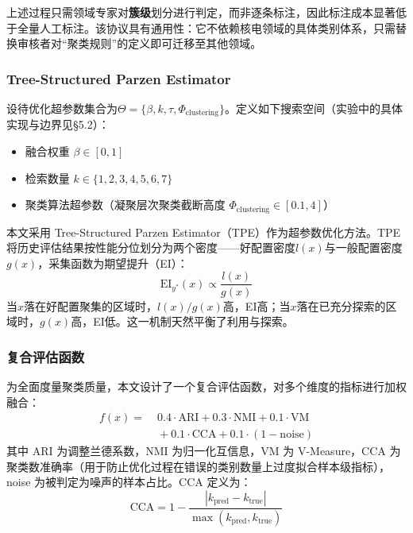 \documentclass[10.5pt,compsoc,UTF8]{CjC}
\theoremstyle{mystyle}
\begin{document}
上述过程只需领域专家对\textbf{簇级}划分进行判定，而非逐条标注，因此标注成本显著低于全量人工标注。该协议具有通用性：它不依赖核电领域的具体类别体系，只需替换审核者对``聚类规则''的定义即可迁移至其他领域。

\subsubsection{Tree-Structured Parzen Estimator}

设待优化超参数集合为$\Theta = \{\beta, k, \tau, \Phi_{\text{clustering}}\}$。定义如下搜索空间（实验中的具体实现与边界见\S 5.2）：
\begin{itemize}[leftmargin=1.5em,itemsep=1pt]
  \item 融合权重 $\beta \in [0, 1]$
  \item 检索数量 $k \in \{1, 2, 3, 4, 5, 6, 7\}$
  \item 聚类算法超参数（凝聚层次聚类截断高度 $\Phi_{\text{clustering}} \in [0.1, 4]$）
\end{itemize}

本文采用 Tree-Structured Parzen Estimator（TPE）作为超参数优化方法。TPE 将历史评估结果按性能分位划分为两个密度——好配置密度$l(x)$与一般配置密度$g(x)$，采集函数为期望提升（EI）：
\begin{equation}
\mathrm{EI}_{y^*}(x) \propto \frac{l(x)}{g(x)}
\label{eq:tpe}
\end{equation}
当$x$落在好配置聚集的区域时，$l(x)/g(x)$高，EI高；当$x$落在已充分探索的区域时，$g(x)$高，EI低。这一机制天然平衡了利用与探索。

\subsubsection{复合评估函数}

为全面度量聚类质量，本文设计了一个复合评估函数，对多个维度的指标进行加权融合：
\begin{equation}
\begin{aligned}
f(x) = &\; 0.4 \cdot \mathrm{ARI} + 0.3 \cdot \mathrm{NMI} + 0.1 \cdot \mathrm{VM} \\
       &\; + 0.1 \cdot \mathrm{CCA} + 0.1 \cdot \mathrm{(1-\text{noise})}
\end{aligned}
\label{eq:composite}
\end{equation}
其中 ARI 为调整兰德系数，NMI 为归一化互信息，VM 为 V-Measure，CCA 为聚类数准确率（用于防止优化过程在错误的类别数量上过度拟合样本级指标），noise 为被判定为噪声的样本占比。CCA 定义为：
\begin{equation}
\mathrm{CCA} = 1 - \frac{|k_{\text{pred}} - k_{\text{true}}|}{\max(k_{\text{pred}}, k_{\text{true}})}
\label{eq:cca}
\end{equation}
\end{document}
